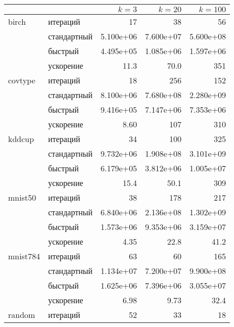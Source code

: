 \begin{table}
  \begin{tabular}{|llrrr|} \hline
             &             & \( k = 3 \) & \( k = 20 \) & \( k = 100 \) \\ \hline
    birch    & итераций    &          17 &           38 &            56 \\
             & стандартный &   5.100e+06 &    7.600e+07 &     5.600e+08 \\
             & быстрый     &   4.495e+05 &    1.085e+06 &     1.597e+06 \\
             & ускорение   &        11.3 &         70.0 &           351 \\ \hline
    covtype  & итераций    &          18 &          256 &           152 \\
             & стандартный &   8.100e+06 &    7.680e+08 &     2.280e+09 \\
             & быстрый     &   9.416e+05 &    7.147e+06 &     7.353e+06 \\
             & ускорение   &        8.60 &          107 &           310 \\ \hline
    kddcup   & итераций    &          34 &          100 &           325 \\
             & стандартный &   9.732e+06 &    1.908e+08 &     3.101e+09 \\
             & быстрый     &   6.179e+05 &    3.812e+06 &     1.005e+07 \\
             & ускорение   &        15.4 &         50.1 &           309 \\ \hline
    mnist50  & итераций    &          38 &          178 &           217 \\
             & стандартный &   6.840e+06 &    2.136e+08 &     1.302e+09 \\
             & быстрый     &   1.573e+06 &    9.353e+06 &     3.159e+07 \\
             & ускорение   &        4.35 &         22.8 &          41.2 \\ \hline
    mnist784 & итераций    &          63 &           60 &           165 \\
             & стандартный &   1.134e+07 &    7.200e+07 &     9.900e+08 \\
             & быстрый     &   1.625e+06 &    7.396e+06 &     3.055e+07 \\
             & ускорение   &        6.98 &         9.73 &          32.4 \\ \hline
    random   & итераций    &          52 &           33 &            18 \\

\end{tabular}
\end{table}
